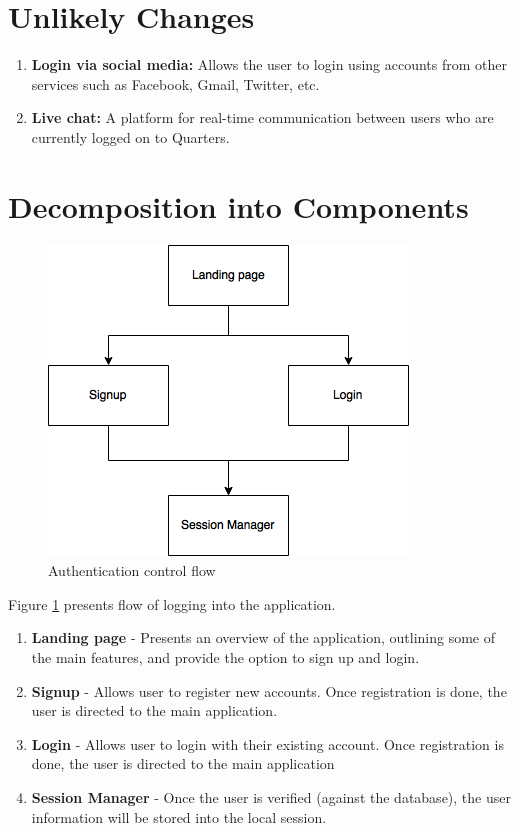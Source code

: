 \documentclass[12pt]{article}
\begin{document}
\section{Unlikely Changes}
\begin{enumerate}
  \item \textbf{Login via social media:} Allows the user to login using accounts from other services such as Facebook, Gmail, Twitter, etc.
  \item \textbf{Live chat:} A platform for real-time communication between users who are currently logged on to Quarters.
\end{enumerate}

%
\section{Decomposition into Components}
\begin{figure}
\centering
\includegraphics[scale=0.75]{login}
\caption{Authentication control flow}
\label{fig:auflow}
\end{figure}

Figure \ref{fig:auflow} presents flow of logging into the application.
\begin{enumerate}
    \item \textbf{Landing page} - Presents an overview of the application, outlining some of the main features, and provide the option to sign up and login.
    \item \textbf{Signup} - Allows user to register new accounts. Once registration is done, the user is directed to the main application.
    \item \textbf{Login} - Allows user to login with their existing account. Once registration is done, the user is directed to the main application
    \item \textbf{Session Manager} - Once the user is verified (against the database), the user information will be stored into the local session.
\end{enumerate}
\end{document}
